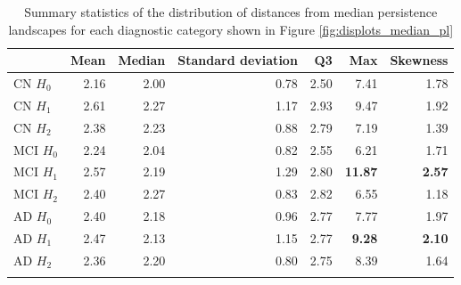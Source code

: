 \documentclass{article}
\begin{document}
\begin{table}
\centering
\begin{tabular}{lrrrrrr}
\toprule
{} &  Mean &  Median &  Standard deviation &   Q3 &   Max &  Skewness \\
\midrule
CN $H_0$ & 2.16 & 2.00 & 0.78 & 2.50 & 7.41 & 1.78 \\
CN $H_1$ & 2.61 & 2.27 & 1.17 & 2.93 & 9.47 & 1.92 \\
CN $H_2$ & 2.38 & 2.23 & 0.88 & 2.79 & 7.19 & 1.39 \\
MCI $H_0$ & 2.24 & 2.04 & 0.82 & 2.55 & 6.21 & 1.71 \\
MCI $H_1$ & 2.57 & 2.19 & 1.29 & 2.80 & \textbf{11.87} & \textbf{2.57} \\
MCI $H_2$ & 2.40 & 2.27 & 0.83 & 2.82 & 6.55 & 1.18 \\
AD $H_0$ & 2.40 & 2.18 & 0.96 & 2.77 & 7.77 & 1.97 \\
AD $H_1$ & 2.47 & 2.13 & 1.15 & 2.77 & \textbf{9.28} & \textbf{2.10} \\
AD $H_2$ & 2.36 & 2.20 & 0.80 & 2.75 & 8.39 & 1.64 \\
  \bottomrule
  \vspace{6pt}
\end{tabular}
\caption{Summary statistics of the distribution of distances from median persistence landscapes for each diagnostic category shown in Figure \ref{fig:displots_median_pl}}
\label{tab:stats_median_pl}
\end{table}
\end{document}
